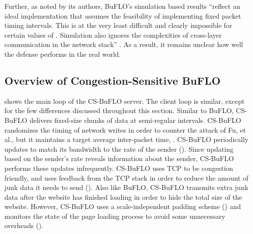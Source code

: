 \documentclass[10pt,journal]{IEEEtran}
\newcommand{\buflo} {BuFLO\xspace}
\newcommand{\csbuflo} {Congestion-Sensitive BuFLO\xspace}
\newcommand{\csb} {CS-BuFLO\xspace}
\begin{document}
Further, as noted by its authors, \buflo's simulation based results
``reflect an ideal implementation that assumes the feasibility of
implementing fixed packet timing intervals. This is at the very
least difficult and clearly impossible for certain values of .
Simulation also ignores the complexities of cross-layer communication 
in the network stack'' \cite{dyer-snp12}. As a result, it remains 
unclear how well the defense performs in the real world.


\subsection{Overview of \csbuflo}

 shows the main loop of the \csb server.  The
client loop is similar, except for the few differences discussed
throughout this section.  Similar to \buflo, \csb delivers
fixed-size chunks of data at semi-regular intervals.  \csb randomizes
the timing of network writes in order to counter the attack of Fu, et
al.\cite{fu-iaw03}, but it maintains a target average inter-packet
time, .  \csb periodically updates  to match its
bandwidth to the rate of the sender ().
Since updating  based on the sender's rate reveals information
about the sender, \csb performs these updates infrequently.  \csb uses
TCP to be congestion friendly, and uses feedback from the TCP stack in
order to reduce the amount of junk data it needs to send
().  Also like \buflo, \csb
transmits extra junk data after the website has finished loading in
order to hide the total size of the website.  However, \csb uses a
scale-independent padding scheme () and
monitors the state of the page loading process to avoid some
unnecessary overheads  ().
\end{document}
